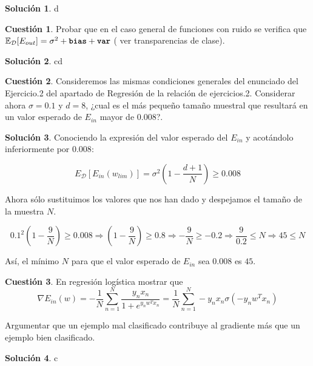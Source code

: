 \documentclass[a4paper, 11pt]{article}
\theoremstyle{definition}
\newtheorem{cuestion}{Cuestión}
\newtheorem*{solucion}{Solución}
\begin{document}
  \begin{solucion}
    d
  \end{solucion}

  \begin{cuestion}
    Probar que en el caso general de funciones con ruido se verifica que $\mathbb{E}_{\mathcal{D}}[E_{out}]= \sigma^2+\texttt{\textbf{bias}}+\texttt{\textbf{var}}$ ( ver transparencias de clase).

  \end{cuestion}

  \begin{solucion}
    cd
  \end{solucion}

  \begin{cuestion}
    Consideremos las mismas condiciones generales del enunciado del Ejercicio.2 del apartado de Regresión de la relación de ejercicios.2.
    Considerar ahora $\sigma=0.1$ y $d=8$, ¿cual es el más pequeño tamaño muestral que resultará en un valor esperado de $E_{in}$ mayor de $0.008$?.
  \end{cuestion}


  \begin{solucion}
    Conociendo la expresión del valor esperado del $E_{in}$ y acotándolo inferiormente por $0.008$:

    $$E_{\mathcal{D}} \left[ E_{in}(w_{lim})\right] = \sigma^2 \left(1 - \frac{d+1}{N}\right) \geq 0.008$$

    Ahora sólo sustituimos los valores que nos han dado y despejamos el tamaño de la muestra $N$.

    $$0.1^2 \left(1 - \frac{9}{N}\right) \geq 0.008 \Rightarrow \left(1 - \frac{9}{N}\right) \geq 0.8 \Rightarrow -\frac{9}{N} \geq -0.2 \Rightarrow \frac{9}{0.2} \leq N \Rightarrow 45 \leq N$$

    Así, el mínimo $N$ para que el valor esperado de $E_{in}$ sea $0.008$ es $45$.
  \end{solucion}

  \begin{cuestion}
    En regresión logística mostrar que
    \[
    \nabla E_{in}(w)=-\frac{1}{N}\sum_{n=1}^{N}\frac{y_nx_n}{1+e^{y_nw^Tx_n}}= \frac{1}{N}\sum_{n=1}^{N}-y_nx_n\sigma(-y_nw^Tx_n)
    \]

    Argumentar que un ejemplo mal clasificado contribuye  al gradiente más que un ejemplo bien clasificado.
  \end{cuestion}

  \begin{solucion}
    c
  \end{solucion}
\end{document}
